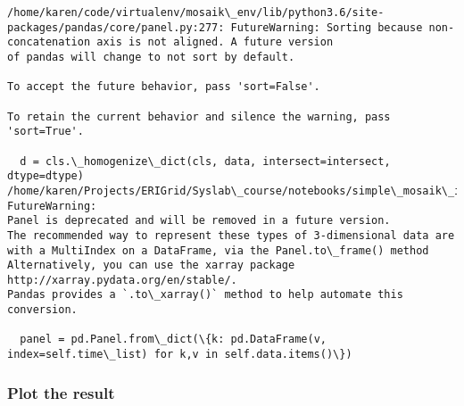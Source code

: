 \documentclass[11pt]{article}
\begin{document}
    \begin{Verbatim}[commandchars=\\\{\}]
/home/karen/code/virtualenv/mosaik\_env/lib/python3.6/site-packages/pandas/core/panel.py:277: FutureWarning: Sorting because non-concatenation axis is not aligned. A future version
of pandas will change to not sort by default.

To accept the future behavior, pass 'sort=False'.

To retain the current behavior and silence the warning, pass 'sort=True'.

  d = cls.\_homogenize\_dict(cls, data, intersect=intersect, dtype=dtype)
/home/karen/Projects/ERIGrid/Syslab\_course/notebooks/simple\_mosaik\_intro/scenario\_build\_up/collector.py:70: FutureWarning: 
Panel is deprecated and will be removed in a future version.
The recommended way to represent these types of 3-dimensional data are with a MultiIndex on a DataFrame, via the Panel.to\_frame() method
Alternatively, you can use the xarray package http://xarray.pydata.org/en/stable/.
Pandas provides a `.to\_xarray()` method to help automate this conversion.

  panel = pd.Panel.from\_dict(\{k: pd.DataFrame(v, index=self.time\_list) for k,v in self.data.items()\})

    \end{Verbatim}

    \subsubsection{Plot the result}\label{plot-the-result}
\end{document}
